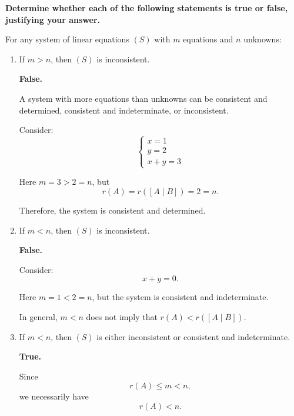 
\item \textbf{Determine whether each of
the following statements is true or false,
justifying your answer.}

For any system of linear equations $(S)$
with $m$ equations and $n$ unknowns:

\begin{enumerate}[label=\alph*)]

    \item If $m>n$, then $(S)$ is inconsistent.

    \begin{answer}
        \textbf{False.}

        A system with more equations than
        unknowns can be consistent and
        determined, consistent and
        indeterminate, or inconsistent.

        Consider:
        $$
        \begin{cases}
            x=1\\
            y=2\\
            x+y=3
        \end{cases}
        $$

        Here $m=3>2=n$, but
        $$
        r(A)=r([A\mid B])=2=n.
        $$

        Therefore, the system is
        consistent and determined.
    \end{answer}

    \item If $m<n$, then $(S)$ is inconsistent.

    \begin{answer}
        \textbf{False.}

        Consider:
        $$
        x+y=0.
        $$

        Here $m=1<2=n$, but the system
        is consistent and indeterminate.

        In general, $m<n$ does not
        imply that
        $r(A)<r([A\mid B])$.
    \end{answer}

    \item If $m<n$, then $(S)$ is either
    inconsistent or consistent and
    indeterminate.

    \begin{answer}
        \textbf{True.}

        Since
        $$
        r(A)\leq m<n,
        $$
        we necessarily have
        $$
        r(A)<n.
        $$


\end{answer}
\end{enumerate}
